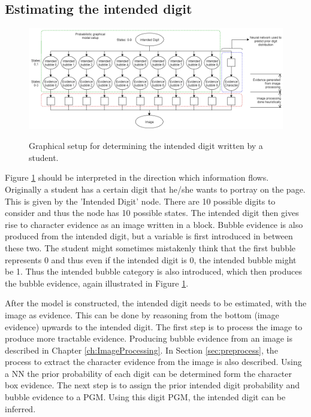 \subsection{Estimating the intended digit}
\label{sec:studentDigit}

\begin{figure}
  \centering
  \includegraphics[width=16cm]{pgmDigit}\\
  \caption{Graphical setup for determining the intended digit written by a student.}
  \label{fig:pgmDigit}
\end{figure}

Figure \ref{fig:pgmDigit} should be interpreted in the direction which information flows. Originally a student has a certain digit that he/she wants to portray on the page. This is given by the 'Intended Digit' node. There are 10 possible digits to consider and thus the node has 10 possible states. The intended digit then gives rise to character evidence as an image written in a block. Bubble evidence is also produced from the intended digit, but a variable is first introduced in between these two. The student might sometimes mistakenly think that the first bubble represents 0 and thus even if the intended digit is 0, the intended bubble might be 1. Thus the intended bubble category is also introduced, which then produces the bubble evidence, again illustrated in Figure \ref{fig:pgmDigit}.  

After the model is constructed, the intended digit needs to be estimated, with the image as evidence. This can be done by reasoning from the bottom (image evidence) upwards to the intended digit. The first step is to process the image to produce more tractable evidence. Producing bubble evidence from an image is described in Chapter \ref{ch:ImageProcessing}. In Section \ref{sec:preprocess}, the process to extract the character evidence from the image is also described. Using a NN the prior probability of each digit can be determined form the character box evidence. The next step is to assign the prior intended digit probability and bubble evidence to a PGM. Using this digit PGM, the intended digit can be inferred.

